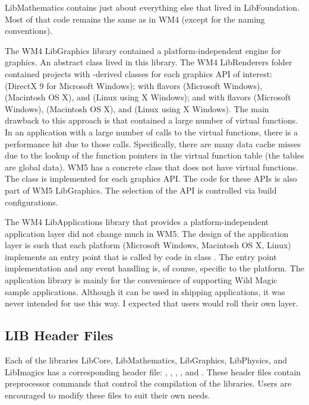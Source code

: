 \documentclass{article}
\begin{document}
LibMathematics contains just about everything else that lived in
LibFoundation.  Most of that code remains the same as in WM4 (except for
the naming conventions).

The WM4 LibGraphics library contained a platform-independent engine for
graphics.  An abstract class  lived in this library.  The WM4
LibRenderers folder contained projects with -derived classes
for each graphics API of interest:  (DirectX 9 for Microsoft
Windows);  with flavors  (Microsoft
Windows),  (Macintosh OS X), and  (Linux
using X Windows); and  with flavors 
(Microsoft Windows),  (Macintosh OS X), and
 (Linux using X Windows).  The main drawback to this
approach is that  contained a large number of virtual
functions.  In an application with a large number of calls to the virtual
functions, there is a performance hit due to those calls.  Specifically, there
are many data cache misses due to the lookup of the function pointers in the
virtual function table (the tables are global data).  WM5 has a concrete class
 that does not have virtual functions.  The class is
implemented for each graphics API.  The code for these APIs is also part of
WM5 LibGraphics.  The selection of the API is controlled via build
configurations.

The WM4 LibApplications library that provides a platform-independent
application layer did not change much in WM5.  The design of the application
layer is such that each platform (Microsoft Windows, Macintosh OS X, Linux)
implements an entry point that is called by code in class .
The entry point implementation and any event handling is, of course, specific
to the platform.  The application library is mainly for the convenience of
supporting Wild Magic sample applications.  Although it can be used in shipping
applications, it was never intended for use this way.  I expected that users
would roll their own layer.

\subsection{LIB Header Files}

Each of the libraries LibCore, LibMathematics, LibGraphics, LibPhysics, and
LibImagics has a corresponding header file:  ,
, , ,
and .  These header files contain preprocessor
commands that control the compilation of the libraries.  Users are encouraged
to modify these files to suit their own needs.
\end{document}
